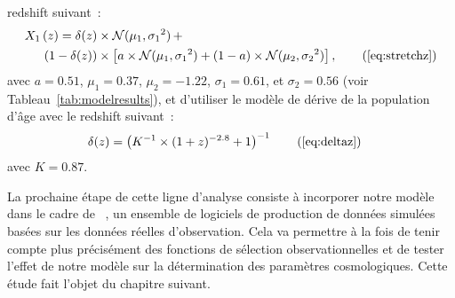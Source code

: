 \documentclass[../main/main.tex]{subfiles}
\begin{document}
\begin{enumerate}
        redshift suivant~:
        \begin{align*}\label{eqconclusion:stretchz}
            X_1\left(z \right) =
            \delta(z)&\times\mathcal{N}(\mu_1,\sigma_1{}^2)\,+\nonumber\\
            (1-\delta(z))&\times \left[a\times\mathcal{N}(\mu_1,\sigma_1{}^2) +
            (1-a)\times\mathcal{N}(\mu_2,\sigma_2{}^2)\right],
            \tag{\ref{eq:stretchz}}
        \end{align*}
        avec $a=0.51$, $\mu_1=0.37$, $\mu_2=-1.22$, $\sigma_1=0.61$, et
        $\sigma_2=0.56$ (voir Tableau~\ref{tab:modelresults}), et d'utiliser
        le modèle de dérive de la population d'âge avec le redshift suivant~:
        \begin{align*}
            \delta(z) & = \left( K^{-1} \times (1+z)^{-2.8} +1 \right)^{-1}
            \tag{\ref{eq:deltaz}}
        \end{align*}
        avec $K=0.87$.
\end{enumerate}

La prochaine étape de cette ligne d'analyse consiste à incorporer notre modèle
dans le cadre de \snana\ \citep{kessler2009a}, un ensemble de logiciels de
production de données simulées basées sur les données réelles d'observation.
Cela va permettre à la fois de tenir compte plus précisément des fonctions de
sélection observationnelles et de tester l'effet de notre modèle sur la
détermination des paramètres cosmologiques. Cette étude fait l'objet du chapitre
suivant.

\clearpage

\thispagestyle{plain}
\vspace*{\fill}
\minilof
\vspace*{\fill}
\minilot
\vspace*{\fill}

% 
% 
\end{document}
